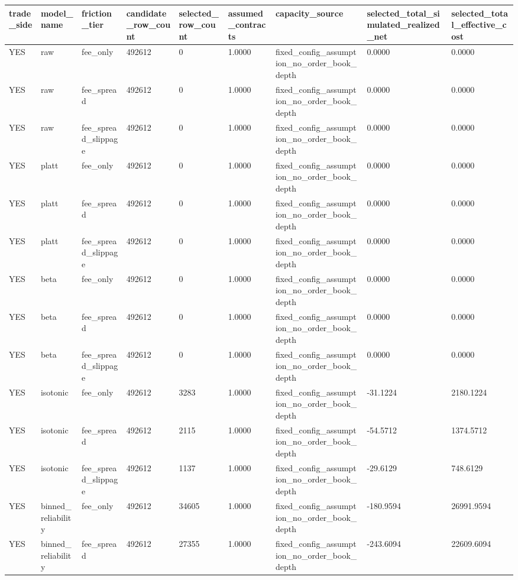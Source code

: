 \begin{tabular}{lllllllll}
\toprule
trade\_side & model\_name & friction\_tier & candidate\_row\_count & selected\_row\_count & assumed\_contracts & capacity\_source & selected\_total\_simulated\_realized\_net & selected\_total\_effective\_cost \\
\midrule
YES & raw & fee\_only & 492612 & 0 & 1.0000 & fixed\_config\_assumption\_no\_order\_book\_depth & 0.0000 & 0.0000 \\
YES & raw & fee\_spread & 492612 & 0 & 1.0000 & fixed\_config\_assumption\_no\_order\_book\_depth & 0.0000 & 0.0000 \\
YES & raw & fee\_spread\_slippage & 492612 & 0 & 1.0000 & fixed\_config\_assumption\_no\_order\_book\_depth & 0.0000 & 0.0000 \\
YES & platt & fee\_only & 492612 & 0 & 1.0000 & fixed\_config\_assumption\_no\_order\_book\_depth & 0.0000 & 0.0000 \\
YES & platt & fee\_spread & 492612 & 0 & 1.0000 & fixed\_config\_assumption\_no\_order\_book\_depth & 0.0000 & 0.0000 \\
YES & platt & fee\_spread\_slippage & 492612 & 0 & 1.0000 & fixed\_config\_assumption\_no\_order\_book\_depth & 0.0000 & 0.0000 \\
YES & beta & fee\_only & 492612 & 0 & 1.0000 & fixed\_config\_assumption\_no\_order\_book\_depth & 0.0000 & 0.0000 \\
YES & beta & fee\_spread & 492612 & 0 & 1.0000 & fixed\_config\_assumption\_no\_order\_book\_depth & 0.0000 & 0.0000 \\
YES & beta & fee\_spread\_slippage & 492612 & 0 & 1.0000 & fixed\_config\_assumption\_no\_order\_book\_depth & 0.0000 & 0.0000 \\
YES & isotonic & fee\_only & 492612 & 3283 & 1.0000 & fixed\_config\_assumption\_no\_order\_book\_depth & -31.1224 & 2180.1224 \\
YES & isotonic & fee\_spread & 492612 & 2115 & 1.0000 & fixed\_config\_assumption\_no\_order\_book\_depth & -54.5712 & 1374.5712 \\
YES & isotonic & fee\_spread\_slippage & 492612 & 1137 & 1.0000 & fixed\_config\_assumption\_no\_order\_book\_depth & -29.6129 & 748.6129 \\
YES & binned\_reliability & fee\_only & 492612 & 34605 & 1.0000 & fixed\_config\_assumption\_no\_order\_book\_depth & -180.9594 & 26991.9594 \\
YES & binned\_reliability & fee\_spread & 492612 & 27355 & 1.0000 & fixed\_config\_assumption\_no\_order\_book\_depth & -243.6094 & 22609.6094 \\

\end{tabular}
